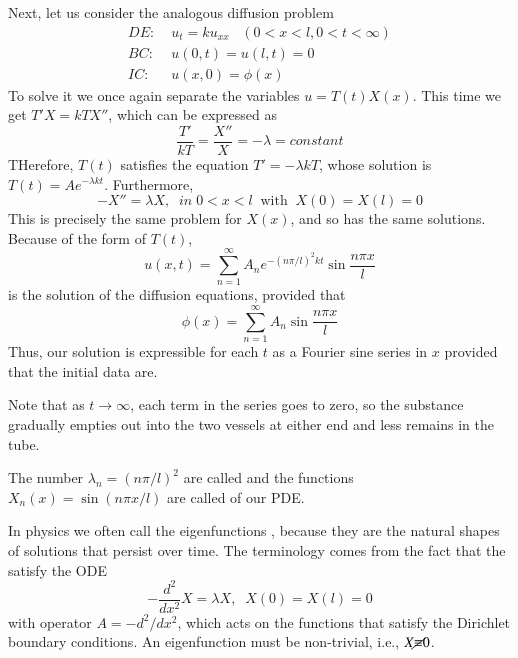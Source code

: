 \documentclass[12pt, a4paper, oneside, openright, titlepage]{book}
\begin{document}
Next, let us consider the analogous diffusion problem \begin{align}
    DE:&\;u_t = ku_{xx} \;\;\;(0 < x < l, 0 < t < \infty) \\
    BC:&\;u(0,t) = u(l,t) = 0 \\
    IC:&\;u(x,0) = \phi(x)
\end{align}
To solve it we once again separate the variables $u = T(t)X(x)$. This time we get $T'X = kTX''$, which can be expressed as \begin{equation*}
    \frac{T'}{kT} = \frac{X''}{X} = -\lambda = constant
\end{equation*}
THerefore, $T(t)$ satisfies the equation $T' = -\lambda kT$, whose solution is $T(t) = Ae^{-\lambda kt}$. Furthermore, \begin{equation*}
    -X'' = \lambda X,\;\;in\;0 < x < l\;\;\text{with}\;\;X(0) = X(l) = 0
\end{equation*}
This is precisely the same problem for $X(x)$, and so has the same solutions. Because of the form of $T(t)$, \begin{equation}
    \boxed{u(x,t) = \sum_{n=1}^{\infty}A_ne^{-(n\pi/l)^2kt}\sin\frac{n\pi x}{l}}
\end{equation}
is the solution of the diffusion equations, provided that \begin{equation}
    \phi(x) = \sum_{n=1}^{\infty}A_n\sin\frac{n\pi x}{l}
\end{equation}
Thus, our solution is expressible for each $t$ as a Fourier sine series in $x$ provided that the initial data are.

Note that as $t\rightarrow \infty$, each term in the series goes to zero, so the substance gradually empties out into the two vessels at either end and less remains in the tube.

\begin{defn}
    The number $\lambda_n = (n\pi/l)^2$ are called  and the functions $X_n(x) = \sin(n\pi x/l)$ are called  of our PDE.
\end{defn}
In physics we often call the eigenfunctions , because they are the natural shapes of solutions that persist over time. The terminology comes from the fact that the satisfy the ODE \begin{equation*}
    -\frac{d^2}{dx^2}X = \lambda X,\;\;X(0) = X(l) = 0
\end{equation*}
with operator $A = -d^2/dx^2$, which acts on the functions that satisfy the Dirichlet boundary conditions. An eigenfunction must be non-trivial, i.e., $X\cancel{\equiv} 0$.
\end{document}
